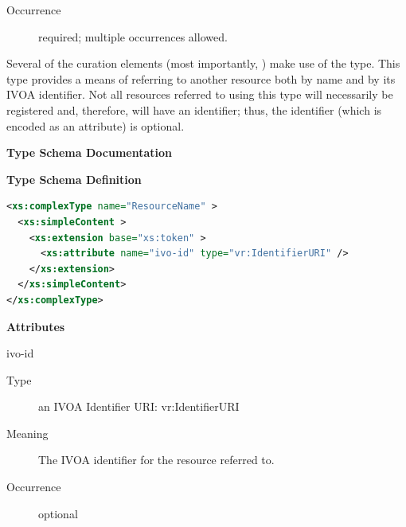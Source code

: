\documentclass[11pt,a4paper]{ivoa}
\begin{document}
\begin{generated}
\begin{bigdescription}
\begin{description}
\item[Occurrence] required; multiple occurrences allowed.

\end{description}


\end{bigdescription}\endgroup

\endgroup
\end{generated}


Several of the curation elements (most importantly,
\/) make use of the
 type.  This type provides a means of
referring to another resource both by name and by its IVOA
identifier.  Not all resources referred to using this type will
necessarily be registered and, therefore, will have an identifier;
thus, the identifier (which is encoded as an attribute) is optional. 


\begin{generated}
\begingroup
      	\renewcommand*\descriptionlabel[1]{%
      	\hbox to 5.5em{\emph{#1}\hfil}}\vspace{2ex}\noindent\textbf{ Type Schema Documentation}


\vspace{1ex}\noindent\textbf{ Type Schema Definition}

\begin{lstlisting}[language=XML,basicstyle=\footnotesize]
<xs:complexType name="ResourceName" >
  <xs:simpleContent >
    <xs:extension base="xs:token" >
      <xs:attribute name="ivo-id" type="vr:IdentifierURI" />
    </xs:extension>
  </xs:simpleContent>
</xs:complexType>
\end{lstlisting}

\vspace{0.5ex}\noindent\textbf{ Attributes}

\begingroup\small\begin{bigdescription}
\item[ivo-id]
\begin{description}
\item[Type] an IVOA Identifier URI: vr:IdentifierURI
\item[Meaning] 
                The IVOA identifier for the resource referred to.
              
\item[Occurrence] optional

\end{description}


\end{bigdescription}\endgroup

\endgroup
\end{generated}
\end{document}
